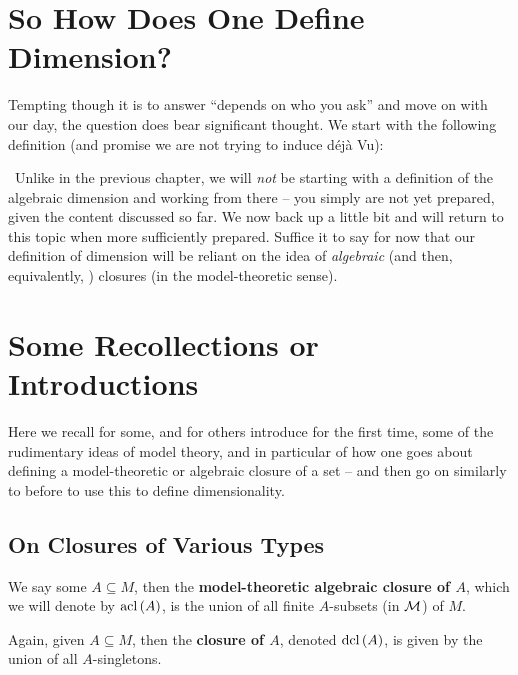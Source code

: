 \section{So How Does One Define Dimension?}
\label{sec:alg_dim}

\noindent Tempting though it is to answer ``depends on who you ask'' and move on with our day, the question does bear significant thought. We start with the following definition (and promise we are not trying to induce d\'ej\`a Vu):

\begin{definition}
  \
  Unlike in the previous chapter, we will \emph{not} be starting with a definition of the algebraic dimension and working from there -- you simply are not yet prepared, given the content discussed so far. We now back up a little bit and will return to this topic when more sufficiently prepared. Suffice it to say for now that our definition of dimension will be reliant on the idea of \emph{algebraic} (and then, equivalently, \emph{}) closures (in the model-theoretic sense).
  \label{defn:alg_dim_fake}
\end{definition}

\section{Some Recollections or Introductions}

Here we recall for some, and for others introduce for the first time, some of the rudimentary ideas of model theory, and in particular of how one goes about defining a model-theoretic or algebraic closure of a set -- and then go on similarly to before to use this to define dimensionality.

\subsection{On Closures of Various Types}

\begin{definition}
  We say some $A \subseteq M$, then the \textbf{model-theoretic algebraic closure of $A$}, which we will denote by $\operatorname{acl}\left(A\right)$, is the union of all finite $A$- subsets (in $\mathcal{M}$) of $M$.
\end{definition}

\begin{definition}
  Again, given $A \subseteq M$, then the \textbf{ closure of $A$}, denoted $\operatorname{dcl}\left(A\right)$, is given by the union of all $A$- singletons.
\end{definition}

